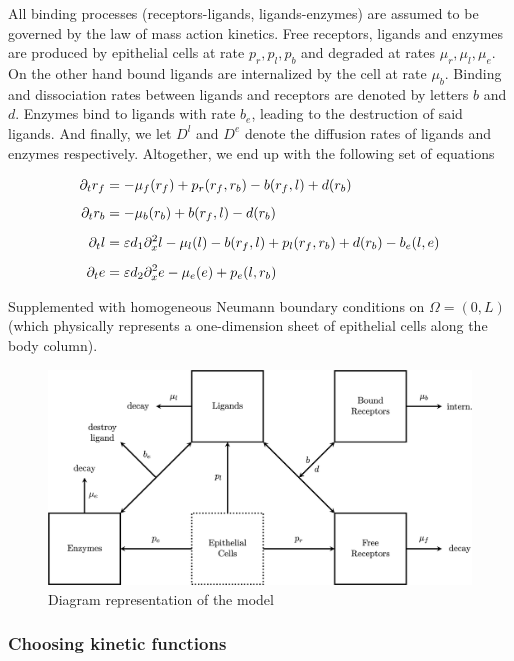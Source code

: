 All binding processes (receptors-ligands, ligands-enzymes) are assumed to be governed by the law of mass action kinetics.  Free receptors, ligands and enzymes are produced by epithelial cells at rate $p_r, p_l, p_b$ and degraded at rates $\mu_r, \mu_l, \mu_e$. On the other hand bound ligands are internalized by the cell at rate $\mu_b$. Binding and dissociation rates between ligands and receptors are denoted by letters $b$ and $d$. Enzymes bind to ligands with rate $b_e$, leading to the destruction of said ligands. And finally, we let $D^l$ and $D^e$ denote the diffusion rates of ligands and enzymes respectively. Altogether, we end up with the following set of equations

\begin{align}
\partial_t r_f &= -\mu_f(r_f) + p_r(r_f, r_b) - b(r_f, l) + d(r_b) \label{eq:kinrf}\\[0.5em]
\partial_t r_b &= - \mu_b(r_b) + b(r_f, l) - d(r_b) \label{eq:kinrb}\\[0.5em]
\partial_t l &= \varepsilon d_1 \partial_x^2 l - \mu_l(l) - b(r_f, l) + p_l(r_f, r_b) +d(r_b) - b_e(l, e) \label{eq:kinl}\\[0.5em]
\partial_t e &= \varepsilon d_2 \partial_x^2 e - \mu_e(e) + p_e(l, r_b) \label{eq:kine}
\end{align}

Supplemented with homogeneous Neumann boundary conditions on $\Omega = (0, L)$ (which physically represents a one-dimension sheet of epithelial cells along the body column). 


\begin{figure}
	\label{diagram}
	\includegraphics[width=\linewidth]{figures/DIAGRAM_MODEL.png}
	\caption{Diagram representation of the model}
\end{figure}

\subsubsection{Choosing kinetic functions}

